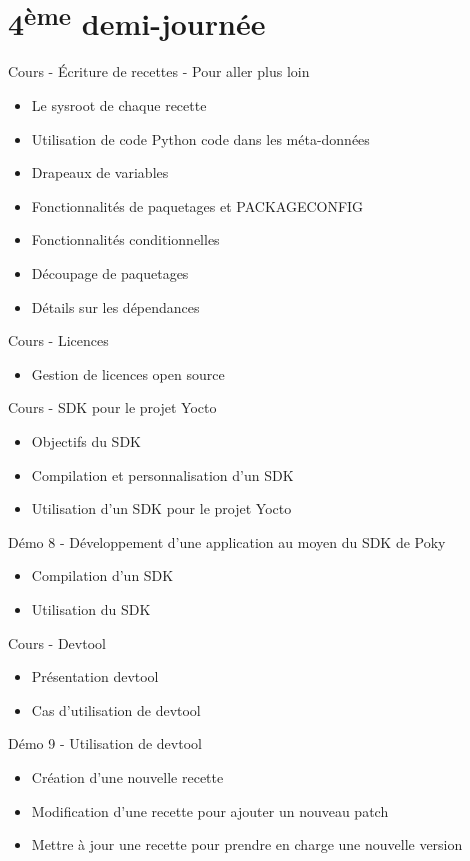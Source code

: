 \documentclass[a4paper,12pt,obeyspaces,spaces,hyphens]{article}
\begin{document}
\section{4\textsuperscript{ème} demi-journée}

\feagendatwocolumn
{Cours - Écriture de recettes - Pour aller plus loin}
{
  \begin{itemize}
  \item Le sysroot de chaque recette
  \item Utilisation de code Python code dans les méta-données
  \item Drapeaux de variables
  \item Fonctionnalités de paquetages et PACKAGECONFIG
  \item Fonctionnalités conditionnelles
  \item Découpage de paquetages
  \item Détails sur les dépendances
  \end{itemize}
}
{Cours - Licences}
{
  \begin{itemize}
  \item Gestion de licences open source
  \end{itemize}
}

\feagendatwocolumn
{Cours - SDK pour le projet Yocto}
{
  \begin{itemize}
  \item Objectifs du SDK
  \item Compilation et personnalisation d'un SDK
  \item Utilisation d'un SDK pour le projet Yocto
  \end{itemize}
}
{Démo 8 - Développement d'une application au moyen du SDK de Poky}
{
  \begin{itemize}
  \item Compilation d'un SDK
  \item Utilisation du SDK
  \end{itemize}
}

\feagendatwocolumn
{Cours - Devtool}
{
  \begin{itemize}
  \item Présentation devtool
  \item Cas d'utilisation de devtool
  \end{itemize}
}
{Démo 9 - Utilisation de devtool}
{
  \begin{itemize}
  \item Création d'une nouvelle recette
  \item Modification d'une recette pour ajouter un nouveau patch
  \item Mettre à jour une recette pour prendre en charge une nouvelle version
  \end{itemize}
}
\end{document}
